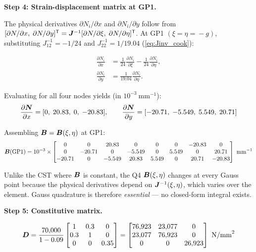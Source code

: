 \begin{example}
\medskip
\noindent\textbf{Step 4: Strain-displacement matrix at GP1.}

The physical derivatives $\partial N_i/\partial x$ and $\partial N_i/\partial y$
follow from $[\partial N/\partial x,\; \partial N/\partial y]^{\mathsf{T}} =
\bm{J}^{-1}[\partial N/\partial\xi,\; \partial N/\partial\eta]^{\mathsf{T}}$.
At GP1 $(\xi\!=\!\eta\!=\!-g)$, substituting $J^{-1}_{12} = -1/24$
and $J^{-1}_{22} = 1/19.04$ (\cref{eq:Jinv_cook}):

\begin{align*}
    \frac{\partial N_i}{\partial x}
    &= \frac{1}{24}\frac{\partial N_i}{\partial\xi}
      -\frac{1}{24}\frac{\partial N_i}{\partial\eta},\\[4pt]
    \frac{\partial N_i}{\partial y}
    &= \frac{1}{19.04}\frac{\partial N_i}{\partial\eta}.
\end{align*}

Evaluating for all four nodes yields (in $10^{-3}\ \text{mm}^{-1}$):
\[
    \frac{\partial\bm{N}}{\partial x}
    = [0,\; 20.83,\; 0,\; -20.83],\qquad
    \frac{\partial\bm{N}}{\partial y}
    = [-20.71,\; -5.549,\; 5.549,\; 20.71]
\]

Assembling $\bm{B} = \bm{B}(\xi,\eta)$ at GP1:
\begin{equation}
    \bm{B}(\text{GP1}) = 10^{-3}\times
    \begin{bmatrix}
         0     & 0      & 20.83  & 0      & 0     & 0     & -20.83 & 0     \\
         0     & -20.71 & 0      & -5.549 & 0     & 5.549 & 0      & 20.71 \\
       -20.71  & 0      & -5.549 & 20.83  & 5.549 & 0     & 20.71  & -20.83
    \end{bmatrix}\ \text{mm}^{-1}
    \label{eq:B_q4_gp1}
\end{equation}

\begin{remark}
Unlike the CST where $\bm{B}$ is constant, the Q4 $\bm{B}(\xi,\eta)$
changes at every Gauss point because the physical derivatives depend on
$\bm{J}^{-1}(\xi,\eta)$, which varies over the element. Gauss quadrature
is therefore \emph{essential} --- no closed-form integral exists.
\end{remark}

\medskip
\noindent\textbf{Step 5: Constitutive matrix.}

\begin{equation}
    \bm{D} = \frac{70{,}000}{1-0.09}
    \begin{bmatrix}1&0.3&0\\0.3&1&0\\0&0&0.35\end{bmatrix}
    =
    \begin{bmatrix}
        76{,}923 & 23{,}077 & 0 \\
        23{,}077 & 76{,}923 & 0 \\
        0 & 0 & 26{,}923
    \end{bmatrix}\ \text{N/mm}^2
    \label{eq:D_q4_ex}
\end{equation}


\end{example}
